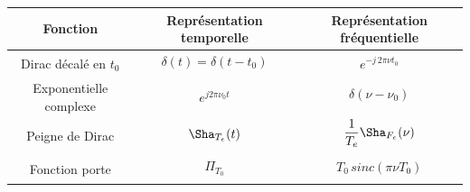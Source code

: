 \begin{center}
\begin{tabular}{|c|c|c|}
\hline
\textbf{Fonction} & \textbf{Représentation temporelle} & \textbf{Représentation fréquentielle} \\ 
\hline
	\multirow{2}{*}{Dirac décalé en $t_0$ } & $\delta(t)=\delta(t-t_0)$ & \multirow{2}{*}{$e^{-j\,2\pi\nu t_0}$} \\
&  & \\
\hline
	\multirow{2}{*}{Exponentielle complexe} & \multirow{2}{*}{$e^{j2\pi \nu_0 t}$} & $\delta(\nu-\nu_0)$ \\
& & \\
\hline
	\multirow{2}{*}{Peigne de Dirac} & $\Sha_{T_e}(t)$ & $\dfrac{1}{T_e}\Sha_{F_e}(\nu)$ \\
&  
& \\
\hline
\multirow{2}{*}{Fonction porte} & $\Pi_{T_0}$ & $ T_0\,sinc(\pi\nu T_0)$ \\
&  
& \\
\hline
\end{tabular}
\end{center}

\endgroup
